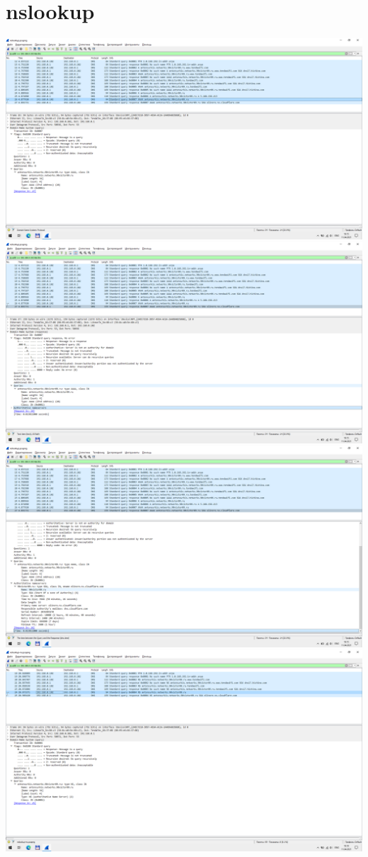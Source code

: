 \section{nslookup}
\includegraphics{screenshots/nslookup_request_1}
\includegraphics{screenshots/nslookup_response_1}
\includegraphics{screenshots/nslookup_response_2}
\includegraphics{screenshots/nslookup-ns_request_1}
